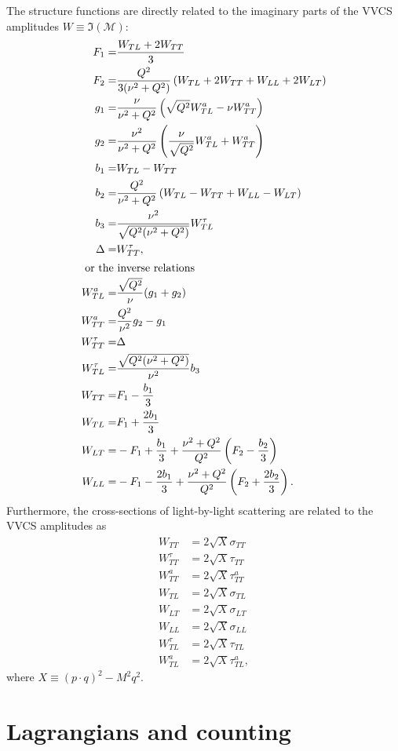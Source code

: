 \documentclass[prl,
twocolumn,
showpacs,preprintnumbers,amsmath,amssymb,
superscriptaddress,
a4paper,nofootinbib,longbibliography]{revtex4-2}
\begin{document}
The structure functions are directly related to the imaginary parts of the VVCS amplitudes $W\equiv\Im(\mathcal{M})$:
\begin{align}
F_1=&\frac{W_{TL}+2W_{TT}}{3}\\
F_2=&\frac{Q^2}{3(\nu^2+Q^2)}\left(W_{TL}+2W_{TT}+W_{LL}+2W_{LT}\right)\\
g_1=&\frac{\nu}{\nu^2+Q^2}\left(\sqrt{Q^2}W_{TL}^a-\nu W_{TT}^a\right)\\
g_2=&\frac{\nu^2}{\nu^2+Q^2}\left(\frac{\nu}{\sqrt{Q^2}}W_{TL}^a+W_{TT}^a\right)\\
b_1=&W_{TL}-W_{TT}\\
b_2=&\frac{Q^2}{\nu^2+Q^2}\left(W_{TL}-W_{TT}+W_{LL}-W_{LT}\right)\\
b_3=&\frac{\nu^2}{\sqrt{Q^2(\nu^2+Q^2)}}W_{TL}^\tau\\
\Delta=&W_{TT}^\tau,\\
\intertext{
or the inverse relations}
W_{TL}^a=&\frac{\sqrt{Q^2}}{\nu}(g_1+g_2)\\
W_{TT}^a=&\frac{Q^2}{\nu^2}g_2-g_1\\
W_{TT}^\tau=&\Delta\\
W_{TL}^\tau=&\frac{\sqrt{Q^2(\nu^2+Q^2)}}{\nu^2}b_3\\
W_{TT}=&F_1-\frac{b_1}{3}\\
W_{TL}=&F_1+\frac{2b_1}{3}\\
W_{LT}=&-F_1+\frac{b_1}{3}+\frac{\nu^2+Q^2}{Q^2}\left(F_2-\frac{b_2}{3}\right)\\
W_{LL}=&-F_1-\frac{2b_1}{3}+\frac{\nu^2+Q^2}{Q^2}\left(F_2+\frac{2b_2}{3}\right).
\end{align}
%
Furthermore, the cross-sections of light-by-light scattering are related to the VVCS amplitudes as
%
\begin{align}
W_{TT} &= 2\sqrt{X}\sigma_{TT} 
\\
W_{TT}^\tau &= 2\sqrt{X}\tau_{TT}\\
W_{TT}^a &= 2\sqrt{X}\tau_{TT}^a\\
W_{TL} &= 2\sqrt{X}\sigma_{TL}\\
W_{LT}  &= 2\sqrt{X}\sigma_{LT}\\
W_{LL}  &= 2\sqrt{X}\sigma_{LL}\\
W_{TL}^\tau &= 2\sqrt{X}\tau_{TL}\\ W_{TL}^a &= 2\sqrt{X}\tau_{TL}^a,
\end{align}
where $X\equiv(p\cdot q)^2-M^2q^2$.


\section{Lagrangians and counting}
\end{document}

